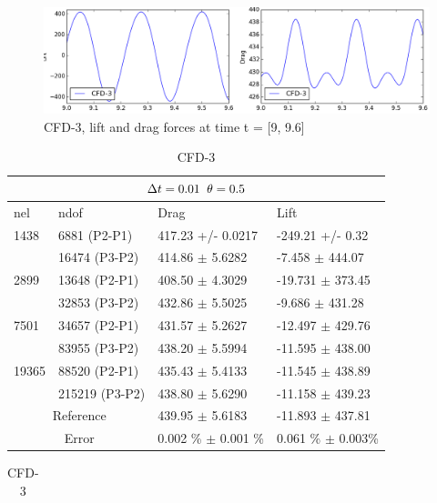 \begin{figure}[h!]
  \centering
    \includegraphics[scale=0.5]{./Fig/cfd3_liftdrag.png}
      \caption{CFD-3, lift and drag forces at time t = [9, 9.6]}
\end{figure}


\begin{table}[h!]
\centering
\caption{CFD-3}
\label{CFD-3 Results}
\begin{tabular}{ |p{1cm}||p{2.9cm}|p{3.3cm}|p{3.3cm}|}
 \hline
  \multicolumn{4}{|c|}{$\Delta t = 0.01 \hspace{2mm} \theta = 0.5$} \\
   \hline
nel & ndof & Drag  & Lift \\
\hline
 1438    & 6881  (P2-P1)   & 417.23       +/-  0.0217 & -249.21       +/-  0.32  \\
   & 16474 (P3-P2)   & 414.86      $\pm$  5.6282 & -7.458      $\pm$  444.07  \\
 \hline
 2899    & 13648  (P2-P1) & 408.50  $\pm$   4.3029 & -19.731  $\pm$   373.45 \\  
     &  32853 (P3-P2)  & 432.86      $\pm$  5.5025 & -9.686      $\pm$  431.28  \\
  \hline
  7501    & 34657 (P2-P1) & 431.57  $\pm$   5.2627 & -12.497  $\pm$   429.76 \\    
    &  83955 (P3-P2)  & 438.20      $\pm$  5.5994 & -11.595      $\pm$  438.00 \\
    \hline
    19365   & 88520 (P2-P1) & 435.43  $\pm$   5.4133 & -11.545  $\pm$   438.89 \\
   &   215219 (P3-P2) & 438.80      $\pm$  5.6290 & -11.158      $\pm$  439.23 \\
\hline
 \multicolumn{2}{|c|}{Reference}  & 439.95 $\pm$ 5.6183 & -11.893 $\pm$ 437.81\\
 \hline
  \multicolumn{2}{|c|}{Error}  & 0.002 \% $\pm$ 0.001 \% & 0.061 \% $\pm$ 0.003\% \\
  \hline
  \end{tabular}
  \vspace{2cm}
 \begin{tabular}{ |p{1cm}||p{2.9cm}|p{3.3cm}|p{3.3cm}|}

\end{tabular}
\end{table}
